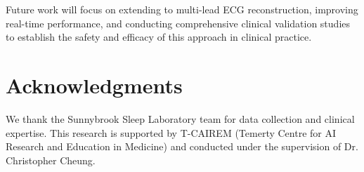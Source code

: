 \documentclass[11pt]{article}
\begin{document}
Future work will focus on extending to multi-lead ECG reconstruction, improving real-time performance, and conducting comprehensive clinical validation studies to establish the safety and efficacy of this approach in clinical practice.

\section*{Acknowledgments}

We thank the Sunnybrook Sleep Laboratory team for data collection and clinical expertise. This research is supported by T-CAIREM (Temerty Centre for AI Research and Education in Medicine) and conducted under the supervision of Dr. Christopher Cheung.



\end{document}
